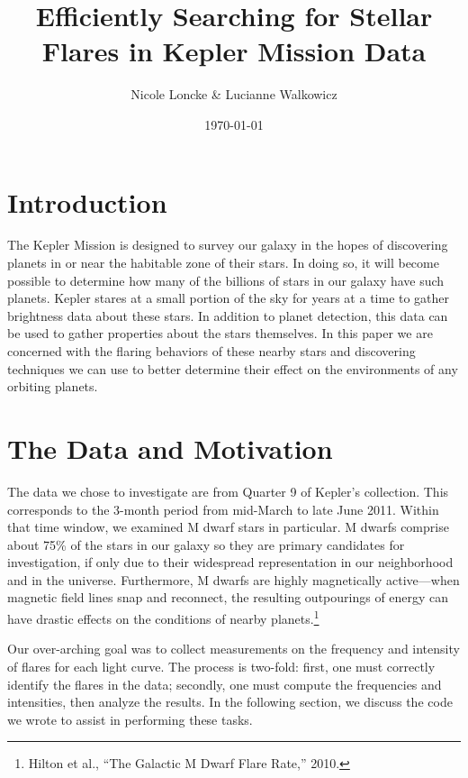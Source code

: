 \documentclass[11pt]{article}
\author{Nicole Loncke \& Lucianne Walkowicz}
\date{\today}
\title{Efficiently Searching for Stellar Flares in Kepler Mission Data}
\begin{document}
\maketitle{}

\section{Introduction}
\label{sec:intro}
The Kepler Mission is designed to survey our galaxy in the hopes of
discovering planets in or near the habitable zone of their stars.  In
doing so, it will become possible to determine how many of the
billions of stars in our galaxy have such planets. Kepler stares at a
small portion of the sky for years at a time to gather brightness data
about these stars.  In addition to planet detection, this data can be
used to gather properties about the stars themselves.  In this paper
we are concerned with the flaring behaviors of these nearby stars and
discovering techniques we can use to better determine their effect on
the environments of any orbiting planets.

\section{The Data and Motivation}
\label{sec:data}
The data we chose to investigate are from Quarter 9 of Kepler's
collection.  This corresponds to the 3-month period from mid-March to
late June 2011.  Within that time window, we examined M dwarf stars in
particular.  M dwarfs comprise about 75\% of the stars in our galaxy
so they are primary candidates for investigation, if only due to their
widespread representation in our neighborhood and in the universe.
Furthermore, M dwarfs are highly magnetically active---when magnetic
field lines snap and reconnect, the resulting outpourings of energy
can have drastic effects on the conditions of nearby
planets.\footnote{Hilton et al., ``The Galactic M Dwarf Flare Rate,''
  2010.}

Our over-arching goal was to collect measurements on the frequency and
intensity of flares for each light curve.  The process is two-fold:
first, one must correctly identify the flares in the data; secondly,
one must compute the frequencies and intensities, then analyze the
results.  In the following section, we discuss the code we wrote to
assist in performing these tasks.
\end{document}
